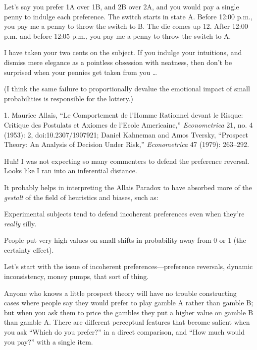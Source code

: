 {
 Let's say you prefer 1A over 1B, and 2B over 2A,
and you would pay a single penny to indulge each preference. The switch
starts in state A. Before 12:00 p.m., you pay me a penny to throw the
switch to B. The die comes up 12. After 12:00 p.m. and before 12:05
p.m., you pay me a penny to throw the switch to A.}

{
 I have taken your two cents on the subject. If you indulge your
intuitions, and dismiss mere elegance as a pointless obsession with
neatness, then don't be surprised when your pennies get
taken from you \ldots}

{
 (I think the same failure to proportionally devalue the emotional
impact of small probabilities is responsible for the lottery.)}

\myendsectiontext


\bigskip

{
 1. Maurice Allais, ``Le Comportement de
l'Homme Rationnel devant le Risque: Critique des
Postulats et Axiomes de l'Ecole
Americaine,'' \textit{Econometrica} 21, no. 4 (1953):
2, doi:10.2307/1907921; Daniel Kahneman and Amos Tversky,
``Prospect Theory: An Analysis of Decision Under
Risk,'' \textit{Econometrica} 47 (1979): 263--292.}


{
 Huh! I was not expecting so many commenters to defend the
preference reversal. Looks like I ran into an inferential distance. }

{
 It probably helps in interpreting the Allais Paradox to have
absorbed more of the \textit{gestalt} of the field of heuristics and
biases, such as:}

{
 Experimental subjects tend to defend incoherent preferences even
when they're \textit{really} silly.}

{
 People put very high values on small shifts in probability away
from 0 or 1 (the certainty effect).}

{
 Let's start with the issue of incoherent
preferences---preference reversals, dynamic inconsistency, money pumps,
that sort of thing.}

{
 Anyone who knows a little prospect theory will have no trouble
constructing cases where people say they would prefer to play gamble A
rather than gamble B; but when you ask them to price the gambles they
put a higher value on gamble B than gamble A. There are different
perceptual features that become salient when you ask
``Which do you prefer?'' in a direct
comparison, and ``How much would you
pay?'' with a single item.}

